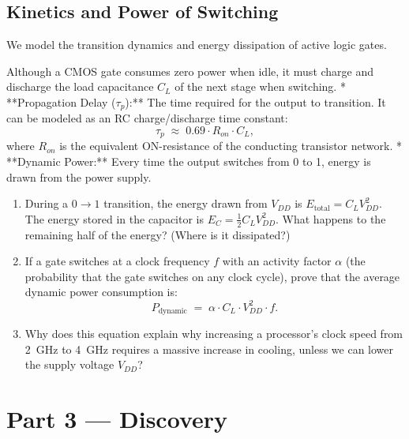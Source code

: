 \documentclass[12pt, a4paper]{book}
\begin{document}
\subsection{Kinetics and Power of Switching}

We model the transition dynamics and energy dissipation of active logic gates.

\begin{explobox}
Although a CMOS gate consumes zero power when idle, it must charge and discharge the load capacitance $C_L$ of the next stage when switching.
* **Propagation Delay ($\tau_p$):** The time required for the output to transition. It can be modeled as an RC charge/discharge time constant:
  \[
    \tau_p \;\approx\; 0.69 \cdot R_{on} \cdot C_L,
  \]
  where $R_{on}$ is the equivalent ON-resistance of the conducting transistor network.
* **Dynamic Power:** Every time the output switches from 0 to 1, energy is drawn from the power supply.
\begin{enumerate}[label=(\alph*), leftmargin=*]
  \item During a $0 \to 1$ transition, the energy drawn from $V_{DD}$ is $E_{\text{total}} = C_L V_{DD}^2$. The energy stored in the capacitor is $E_C = \frac{1}{2} C_L V_{DD}^2$.
        What happens to the remaining half of the energy? (Where is it dissipated?)
  \item If a gate switches at a clock frequency $f$ with an activity factor $\alpha$ (the probability that the gate switches on any clock cycle), prove that the average dynamic power consumption is:
  \[
    P_{\text{dynamic}} \;=\; \alpha \cdot C_L \cdot V_{DD}^2 \cdot f.
  \]
  \item Why does this equation explain why increasing a processor's clock speed from \SI{2}{GHz} to \SI{4}{GHz} requires a massive increase in cooling, unless we can lower the supply voltage $V_{DD}$?
\end{enumerate}
\end{explobox}

\newpage

\section{Part 3 --- Discovery}
\end{document}

